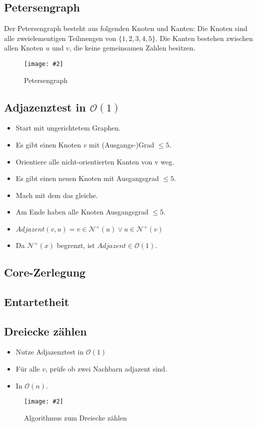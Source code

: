 \documentclass[10pt,a4paper]{article}
\makeatletter
\def\maxwidth#1{\ifdim\Gin@nat@width>#1 #1\else\Gin@nat@width\fi}
\newcommand{\imageFigure}[4]{%
    \begin{figure}[h]%
        \centering%
        {%
            \setlength{\fboxsep}{1pt}%
            \setlength{\fboxrule}{1pt}%
            \texttt{[image: \#2]}%
        }%
        \caption{#1}%
        \label{fig:#4}%
    \end{figure}%
}
\makeatother
\begin{document}
\subsection{Petersengraph}
Der Petersengraph besteht aus folgenden Knoten und Kanten:
Die Knoten sind alle zweielementigen Teilmengen von $\{1,2,3,4,5\}$.
Die Kanten bestehen zwischen allen Knoten $u$ und $v$, die keine gemeinsamen
Zahlen besitzen.
\imageFigure{Petersengraph}{petersen2.png}{.4}{petersen2}
\subsection{Adjazenztest in $\mathcal{O}(1)$}
\begin{itemize}
    \item Start mit ungerichtetem Graphen.
    \item Es gibt einen Knoten $v$ mit (Ausgangs-)Grad $\leq 5$.
    \item Orientiere alle nicht-orientierten Kanten von v weg.
    \item Es gibt einen neuen Knoten mit Ausgangsgrad $\leq 5$.
    \item Mach mit dem das gleiche.
    \item Am Ende haben alle Knoten Ausgangsgrad $\leq 5$.
    \item $Adjazent(v,u) = v\in\mathcal{N}^+(u) \lor u\in\mathcal{N}^+(v)$
    \item Da $\mathcal{N}^+(x)$ begrenzt, ist $Adjazent \in \mathcal{O}(1)$.
\end{itemize}
\subsection{Core-Zerlegung}
\subsection{Entartetheit}
\subsection{Dreiecke zählen}
\begin{itemize}
    \item Nutze Adjazenztest in $\mathcal{O}(1)$
    \item Für alle $v$, prüfe ob zwei Nachbarn adjazent sind.
    \item In $\mathcal{O}(n)$.
\end{itemize}
\imageFigure{Algorithmus zum Dreiecke zählen}{dreiecke.png}{.5}{dreiecke}
\end{document}
